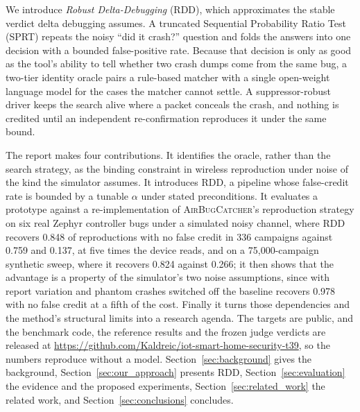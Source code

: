 We introduce \emph{Robust Delta-Debugging} (RDD), which approximates the stable
verdict delta debugging assumes. A truncated Sequential Probability Ratio Test
(SPRT) repeats the noisy ``did it crash?'' question and folds the answers into one
decision with a bounded false-positive rate. Because that decision is only as good
as the tool's ability to tell whether two crash dumps come from the same bug, a
two-tier identity oracle pairs a rule-based matcher with a single open-weight
language model for the cases the matcher cannot settle. A suppressor-robust driver
keeps the search alive where a packet conceals the crash, and nothing is credited
until an independent re-confirmation reproduces it under the same bound.

The report makes four contributions. It identifies the oracle, rather than the
search strategy, as the binding constraint in wireless reproduction under noise of
the kind the simulator assumes. It
introduces RDD, a pipeline whose false-credit rate is bounded by a tunable
$\alpha$ under stated preconditions. It evaluates a prototype against a
re-implementation of \textsc{AirBugCatcher}'s reproduction strategy on six real
Zephyr controller bugs under a simulated noisy channel, where RDD recovers 0.848
of reproductions with no false credit in 336 campaigns against 0.759 and 0.137,
at five times the device reads, and on a 75,000-campaign synthetic sweep, where
it recovers 0.824 against 0.266; it then shows that the advantage is a property
of the simulator's two noise assumptions, since with report variation and
phantom crashes switched off the baseline recovers 0.978 with no false credit at
a fifth of the cost. %
Finally it turns those dependencies and the method's structural limits into a
research agenda. The targets are public, and the benchmark code, the reference results and the
frozen judge verdicts are released at
\url{https://github.com/Kaldreic/iot-smart-home-security-t39}, so the numbers
reproduce without a model.
Section~\ref{sec:background} gives the background, Section~\ref{sec:our_approach}
presents RDD, Section~\ref{sec:evaluation} the evidence and the proposed
experiments, Section~\ref{sec:related_work} the related work, and
Section~\ref{sec:conclusions} concludes.
